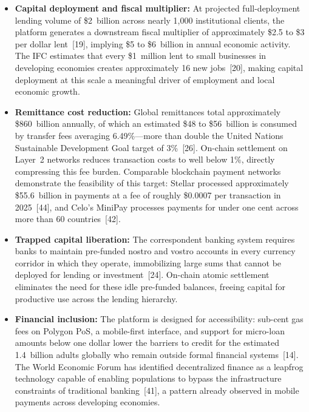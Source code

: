 \documentclass[12pt,a4paper]{report}
\begin{document}
\begin{itemize}[noitemsep]
\item \textbf{Capital deployment and fiscal multiplier:} At projected full-deployment lending volume of \$2~billion across nearly 1,000 institutional clients, the platform generates a downstream fiscal multiplier of approximately \$2.5 to \$3 per dollar lent~[19], implying \$5 to \$6~billion in annual economic activity. The IFC estimates that every \$1~million lent to small businesses in developing economies creates approximately 16 new jobs~[20], making capital deployment at this scale a meaningful driver of employment and local economic growth.

\item \textbf{Remittance cost reduction:} Global remittances total approximately \$860~billion annually, of which an estimated \$48 to \$56~billion is consumed by transfer fees averaging 6.49\%---more than double the United Nations Sustainable Development Goal target of 3\%~[26]. On-chain settlement on Layer~2 networks reduces transaction costs to well below 1\%, directly compressing this fee burden. Comparable blockchain payment networks demonstrate the feasibility of this target: Stellar processed approximately \$55.6~billion in payments at a fee of roughly \$0.0007 per transaction in 2025~[44], and Celo's MiniPay processes payments for under one cent across more than 60 countries~[42].

\item \textbf{Trapped capital liberation:} The correspondent banking system requires banks to maintain pre-funded nostro and vostro accounts in every currency corridor in which they operate, immobilizing large sums that cannot be deployed for lending or investment~[24]. On-chain atomic settlement eliminates the need for these idle pre-funded balances, freeing capital for productive use across the lending hierarchy.

\item \textbf{Financial inclusion:} The platform is designed for accessibility: sub-cent gas fees on Polygon PoS, a mobile-first interface, and support for micro-loan amounts below one dollar lower the barriers to credit for the estimated 1.4~billion adults globally who remain outside formal financial systems~[14]. The World Economic Forum has identified decentralized finance as a leapfrog technology capable of enabling populations to bypass the infrastructure constraints of traditional banking~[41], a pattern already observed in mobile payments across developing economies.


\end{itemize}
\end{document}
